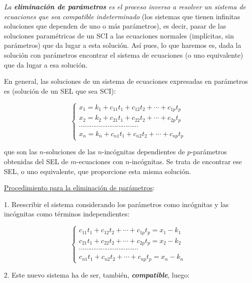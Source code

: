 \justify

\emph{La \textbf{eliminación de parámetros} es el proceso inverso a resolver un sistema de ecuaciones que sea compatible
indeterminado} (los sistemas que tienen infinitas soluciones  que  dependen  de uno o más parámetros), es decir,  pasar de las soluciones paramétricas de un SCI a las ecuaciones normales (implícitas, sin parámetros) que da lugar a esta solución. Así pues, lo que haremos es, dada la solución con parámetros encontrar el sistema de ecuaciones (o uno equivalente) que da lugar a esa solución.

En general, las soluciones de un sistema de ecuaciones expresadas en parámetros es (solución de un SEL que sea SCI):

\begin{equation*}
	\begin{cases}
	x_1=k_1+c_{11}t_1+c_{12}t_2+\cdots +c_{1p}t_p \\
	x_2=k_2+c_{21}t_1+c_{22}t_2+\cdots +c_{2p}t_p \\
	\cdots  \cdots \cdots \cdots \cdots \cdots \cdots \cdots \cdots \cdots \cdots\\
	x_n=k_n+c_{n1}t_1+c_{n2}t_2+ \cdots + c_{np}t_p
	\end{cases}
\end{equation*} 

\noindent que son las $n$-soluciones de las $n$-incógnitas dependientes de $p$-parámetros obtenidas del SEL de $m$-ecuaciones con $n$-incógnitas. Se trata de encontrar ese SEL, o uno equivalente, que proporcione esta misma solución.

\underline{Procedimiento para la eliminación de parámetros}:

1. Reescribir el sistema considerando los parámetros como incógnitas y las incógnitas como términos independientes:

\begin{equation*}
	\begin{cases}
	c_{11}t_1+c_{12}t_2+\cdots +c_{1p}t_p=x_1-k_1 \\
	c_{21}t_1+c_{22}t_2+\cdots +c_{2p}t_p=x_2-k_2 \\
	\cdots  \cdots \cdots \cdots \cdots \cdots \cdots \cdots \cdots \cdots \cdots\\
	c_{n1}t_1+c_{n2}t_2+ \cdots + c_{np}t_p=x_n-k_n
	\end{cases}
\end{equation*}

2. Este nuevo sistema ha de ser, también, \emph{\textbf{compatible}}, luego: 

